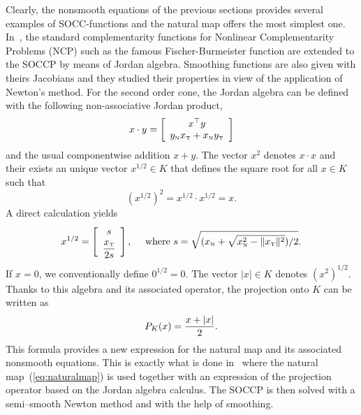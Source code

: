 Clearly, the nonsmooth equations of the previous sections provides several examples of SOCC-functions and the natural map offers the most simplest one. In~\cite{Fukushima.ea2001}, the standard complementarity functions for Nonlinear Complementarity Problems (NCP) such as the famous Fischer-Burmeister function are extended to the SOCCP by means of Jordan algebra. Smoothing functions are also given with theirs Jacobians and they studied their properties in view of the application of Newton's method.  For the second order cone, the Jordan algebra can be defined with the following non-associative Jordan product,
\begin{equation}
  \label{eq:Jordan-product}
  x \cdot y =
  \left[\begin{array}{c}
      x^\top y \\
      y_\n x_\t + x_\n y_\t
  \end{array}
\right]
\end{equation}
and the usual componentwise addition $x+y$. The vector $x^2$ denotes $x\cdot x$ and their exists an unique vector $x^{1/2}\in K$ that defines the square root for all $x \in K$ such that
\begin{equation}
  \label{eq:Jordan-sqrt}
  (x^{1/2})^2 = x^{1/2} \cdot x^{1/2} = x.
\end{equation}
A direct calculation yields
\begin{equation}
  \label{eq:Jordan-sqrt2}
  x^{1/2} =
  \left[\begin{array}{c}
    s \\[1mm]
    \Frac {x_\t} {2s}
  \end{array}\right], \quad \text{ where } s = \sqrt{(x_\n+\sqrt{x_\n^2 - \|x_\t\|^2})/2}.
\end{equation}
If $x=0$, we conventionally define $0^{1/2}=0$. The vector $|x| \in K$ denotes $(x^2)^{1/2}$. Thanks to this algebra and its associated operator, the projection onto $K$ can be written as
\begin{equation}
  \label{eq:Jordan-projection}
  P_K(x) = \Frac{x + |x|}2.
\end{equation}
This formula provides a new expression for the natural map and its associated nonsmooth equations. This is exactly what is done in~\cite{Hayashi.ea_SIOPT2005} where the natural map~(\ref{eq:naturalmap}) is used together with an expression of the projection operator based on the Jordan algebra calculus. The SOCCP is then solved with a semi--smooth Newton method and with the help of smoothing.

